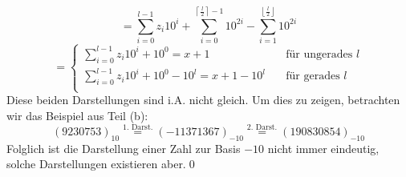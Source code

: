 \documentclass[11pt]{scrartcl}
\theoremstyle{dotless}
\newcommand{\floor}[1]{\left\lfloor #1\right\rfloor}
\newcommand{\ceil}[1]{\left\lceil #1\right\rceil}
\begin{document}
		$$=\sum_{i=0}^{l-1}z_i10^i + \sum_{i=0}^{\ceil{\frac{l}{2}}-1} 10^{2i} - 
		\sum_{i=1}^{\floor{\frac{l}{2}}} 10^{2i}$$
		$$=\left\{\begin{array}{ll}
		\sum_{i=0}^{l-1}z_i10^i+10^0=x+1\quad&\text{für ungerades }l\\
		\sum_{i=0}^{l-1}z_i10^i +10^0 - 10^l=x+1-10^l\quad&\text{für gerades }l\\
		\end{array}\right.
		$$
		Diese beiden Darstellungen sind i.A. nicht gleich. Um dies zu zeigen, betrachten wir das Beispiel aus Teil (b):
		$$(9230753)_{10}\overset{\text{1. Darst.}}{=}(-11371367)_{-10}\overset{\text{2. Darst.}}{=}(190830854)_{-10}$$
		Folglich ist die Darstellung einer Zahl zur Basis $-10$ nicht immer eindeutig, solche Darstellungen existieren aber.\qed
\end{document}
